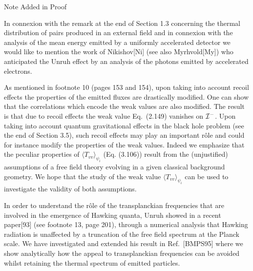 \documentclass[12pt,oneside]{report}
\begin{document}


{\huge Note Added in Proof}


In connexion with the remark at the end of Section 1.3 concerning the thermal
distribution of pairs produced in an external field and in connexion with the analysis of
the mean energy emitted by a uniformly accelerated detector we would like to mention the
work of Nikishov[Ni] (see also Myrhvold[My]) who anticipated the Unruh effect by an
analysis of the photons emitted by accelerated electrons.

As mentioned in footnote 10 (pages 153 and 154), upon taking into account recoil effects
the properties of the emitted fluxes are drastically modified. One can show that the
correlations which encode the weak values are also modified. The result is that due to
recoil effects the weak value Eq.~(2.149) vanishes on ${\cal I}^-$. Upon taking into
account quantum gravitational effects in the black hole problem (see the end of Section
3.5), such recoil effects may play an important r{\^o}le and could for instance modify
the properties of the weak values. Indeed we emphasize that the peculiar properties of
$\langle T_{vv} \rangle_{\psi_i}$ (Eq. (3.106)) result from the (unjustified) assumptions
of a free field theory evolving in a given classical background geometry. We hope 
that the study of the weak value $\langle T_{vv} \rangle_{\psi_i}$  can be used to
investigate the validity of both assumptions.

In order to understand the r{\^o}le of the transplanckian frequencies that are involved
in the emergence of Hawking quanta, Unruh showed in a recent paper[93] (see footnote
13, page 201), through a numerical analysis that Hawking radiation is unaffected by a
truncation of the free field spectrum at the Planck scale. We have investigated and
extended his result in Ref.~[BMPS95] where we show analytically how the appeal to
transplanckian frequencies can be avoided whilst retaining the thermal spectrum of emitted
particles.
\end{document}
